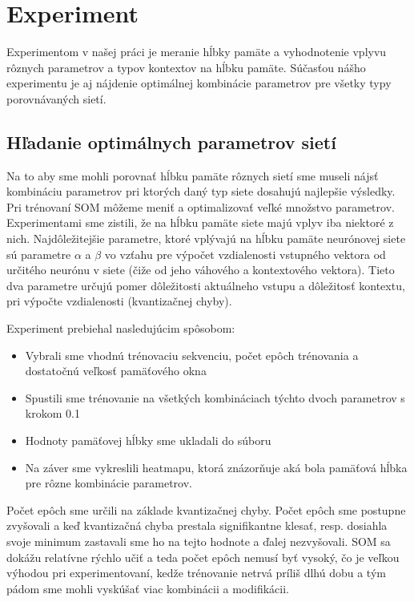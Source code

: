 
\chapter{Experiment}
Experimentom v našej práci je meranie hĺbky pamäte a vyhodnotenie vplyvu rôznych
parametrov a typov kontextov na hĺbku pamäte. Súčasťou nášho experimentu je aj nájdenie 
optimálnej kombinácie parametrov pre všetky typy porovnávaných sietí.

\section{Hľadanie optimálnych parametrov sietí}
Na to aby sme mohli porovnať hĺbku pamäte rôznych sietí sme museli nájsť kombináciu parametrov
pri ktorých daný typ siete dosahujú najlepšie výsledky. 
Pri trénovaní SOM môžeme meniť a optimalizovať veľké množstvo parametrov. 
Experimentami sme zistili, že na hĺbku pamäte siete majú vplyv iba niektoré z nich. 
Najdôležitejšie parametre, ktoré vplývajú na hĺbku pamäte neurónovej siete sú parametre $\alpha$ a $\beta$
vo vzťahu pre výpočet vzdialenosti vstupného vektora od určitého neurónu v siete (čiže od jeho váhového a kontextového vektora).
Tieto dva parametre určujú pomer dôležitosti aktuálneho vstupu a dôležitosť kontextu, pri výpočte vzdialenosti (kvantizačnej chyby).

Experiment prebiehal nasledujúcim spôsobom:
\begin{itemize}
    \item Vybrali sme vhodnú trénovaciu sekvenciu, počet epôch trénovania a dostatočnú veľkosť pamäťového okna
    \item Spustili sme trénovanie na všetkých kombináciach týchto dvoch parametrov s krokom 0.1
    \item Hodnoty pamäťovej hĺbky sme ukladali do súboru
    \item Na záver sme vykreslili heatmapu, ktorá znázorňuje aká bola pamäťová hĺbka pre rôzne kombinácie parametrov.
\end{itemize}


Počet epôch sme určili na základe kvantizačnej chyby.
Počet epôch sme postupne zvyšovali a keď kvantizačná chyba prestala signifikantne klesať, resp. dosiahla 
svoje minimum zastavali sme ho na tejto hodnote a ďalej nezvyšovali. SOM sa dokážu relatívne rýchlo učiť a 
teda počet epôch nemusí byť vysoký, čo je veľkou výhodou pri experimentovaní, kedže trénovanie netrvá príliš dlhú dobu
a tým pádom sme mohli vyskúšať viac kombinácii a modifikácii.

